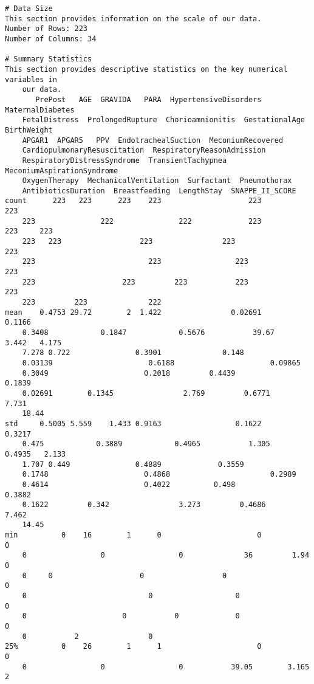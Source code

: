 \documentclass[11pt]{article}
\begin{document}
\begin{Verbatim}[tabsize=4]
# Data Size
This section provides information on the scale of our data.
Number of Rows: 223
Number of Columns: 34

# Summary Statistics
This section provides descriptive statistics on the key numerical variables in
	our data.
       PrePost   AGE  GRAVIDA   PARA  HypertensiveDisorders  MaternalDiabetes
	FetalDistress  ProlongedRupture  Chorioamnionitis  GestationalAge  BirthWeight
	APGAR1  APGAR5   PPV  EndotrachealSuction  MeconiumRecovered
	CardiopulmonaryResuscitation  RespiratoryReasonAdmission
	RespiratoryDistressSyndrome  TransientTachypnea  MeconiumAspirationSyndrome
	OxygenTherapy  MechanicalVentilation  Surfactant  Pneumothorax
	AntibioticsDuration  Breastfeeding  LengthStay  SNAPPE_II_SCORE
count      223   223      223    223                    223               223
	223               222               222             223          223     223
	223   223                  223                223                           223
	223                          223                 223                         223
	223                    223         223           223                  223
	223         223              222
mean    0.4753 29.72        2  1.422                0.02691            0.1166
	0.3408            0.1847            0.5676           39.67        3.442   4.175
	7.278 0.722               0.3901              0.148
	0.03139                      0.6188                      0.09865
	0.3049                      0.2018         0.4439                 0.1839
	0.02691        0.1345                2.769         0.6771       7.731
	18.44
std     0.5005 5.559    1.433 0.9163                 0.1622            0.3217
	0.475            0.3889            0.4965           1.305       0.4935   2.133
	1.707 0.449               0.4889             0.3559
	0.1748                      0.4868                       0.2989
	0.4614                      0.4022          0.498                 0.3882
	0.1622         0.342                3.273         0.4686       7.462
	14.45
min          0    16        1      0                      0                 0
	0                 0                 0              36         1.94       0
	0     0                    0                  0                             0
	0                            0                   0                           0
	0                      0           0             0                    0
	0           2                0
25%          0    26        1      1                      0                 0
	0                 0                 0           39.05        3.165       2

\end{Verbatim}
\end{document}
